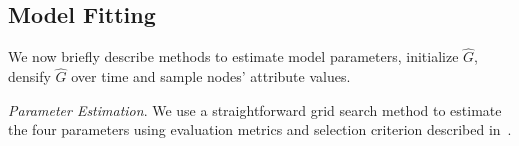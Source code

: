 %
%

\subsection{Model Fitting}
\label{sub:Model Fitting}

We now briefly describe methods to estimate model parameters,
initialize $\hat{G}$, densify $\hat{G}$ over time and sample nodes' attribute values.

\textit{Parameter Estimation}. We use a straightforward grid search method to estimate
the four parameters using evaluation metrics and selection criterion described in~.

